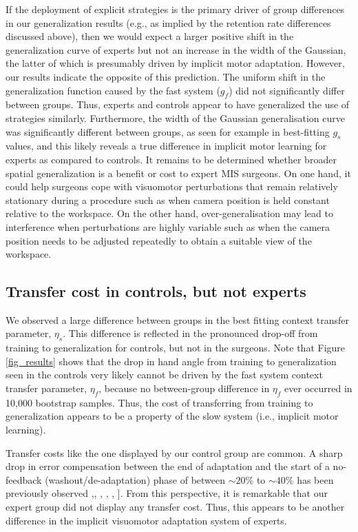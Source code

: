 \documentclass[jou, 11pt, longtable, floatsintext, notab]{apa6}
\begin{document}
If the deployment of explicit strategies is the primary
driver of group differences in our generalization results
(e.g., as implied by the retention rate differences
discussed above), then we would expect a larger positive
shift in the generalization curve of experts but not an
increase in the width of the Gaussian, the latter of which
is presumably driven by implicit motor adaptation. However,
our results indicate the opposite of this prediction. The
uniform shift in the generalization function caused by the
fast system ($g_f$) did not significantly differ between
groups. Thus, experts and controls appear to have
generalized the use of strategies similarly. Furthermore,
the width of the Gaussian generalisation curve was
significantly different between groups, as seen for example
in best-fitting $g_s$ values, and this likely reveals a true
difference in implicit motor learning for experts as
compared to controls. It remains to be determined whether
broader spatial generalization is a benefit or cost to
expert MIS surgeons. On one hand, it could help surgeons
cope with visuomotor perturbations that remain relatively
stationary during a procedure such as when camera position
is held constant relative to the workspace. On the other
hand, over-generalisation may lead to interference when
perturbations are highly variable such as when the camera
position needs to be adjusted repeatedly to obtain a
suitable view of the workspace.


\subsection{Transfer cost in controls, but not experts}
We observed a large difference between groups in the best
fitting context transfer parameter, $\eta_s$. This
difference is reflected in the pronounced drop-off from
training to generalization for controls, but not in the
surgeons. Note that Figure \ref{fig_results} shows that the
drop in hand angle from training to generalization seen in
the controls very likely cannot be driven by the fast system
context transfer parameter, $\eta_f$, because no
between-group difference in $\eta_f$ ever occurred in 10,000
bootstrap samples. Thus, the cost of transferring from
training to generalization appears to be a property of the
slow system (i.e., implicit motor learning).

Transfer costs like the one displayed by our control group
are common. A sharp drop in error compensation between the
end of adaptation and the start of a no-feedback
(washout/de-adaptation) phase of between $\sim20\%$ to
$\sim40\%$ has been previously observed
\cite{hinder_interference_2007},\cite{sternad_motor_2009},
\cite{sadnicka_normal_2014}, \cite{haar_dissociating_2015},
\cite{jalali_neural_2018},
\cite{nakagawa-silva_framework_2018}]. From this
perspective, it is remarkable that our expert group did not
display any transfer cost. Thus, this appears to be another
difference in the implicit visuomotor adaptation system of
experts.
\end{document}
